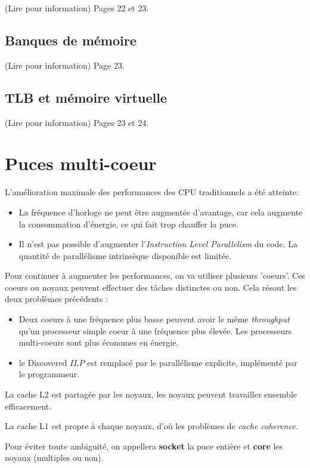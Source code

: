 	(Lire pour information) Pages 22 et 23.
	
	\subsection{Banques de mémoire}
	
	(Lire pour information) Page 23.
	
	\subsection{TLB et mémoire virtuelle}
	
	(Lire pour information) Pages 23 et 24.
	
\section{Puces multi-coeur}

L'amélioration maximale des performances des CPU traditionnels a été atteinte:
\begin{itemize}
\item La fréquence d'horloge ne peut être augmentée d'avantage, car cela augmente la consommation d'énergie, ce qui fait
trop chauffer la puce.
\item Il n'est pas possible d'augmenter l'\textit{Instruction Level Parallelism} du code. La quantité de parallélisme intrinsèque disponible est limitée.
\end{itemize}

Pour continuer à augmenter les performances, on va utiliser plusieurs 'coeurs'. Ces coeurs ou noyaux peuvent effectuer des tâches distinctes ou non. Cela résout les deux problèmes précédents :

\begin{itemize}
	\item Deux coeurs à une fréquence plus basse peuvent avoir le même \textit{throughput} qu'un processeur simple coeur à une fréquence plus élevée. Les processeurs multi-coeurs sont plus économes en énergie.
	\item le Discovered $ILP$ est remplacé par le parallélisme explicite, implémenté par le programmeur. 
\end{itemize}

La cache L2 est partagée par les noyaux, les noyaux peuvent travailler ensemble efficacement.

La cache L1 est propre à chaque noyaux, d'où les problèmes de \textit{cache coherence}.

Pour éviter toute ambiguité, on appellera \textbf{socket} la puce entière et \textbf{core} les noyaux (multiples ou non).

